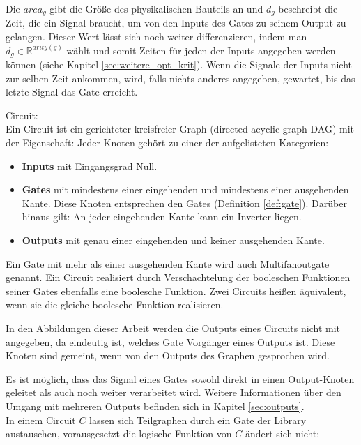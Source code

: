 \documentclass[11pt, a4paper, german]{article}
\begin{document}
Die $area_g$ gibt die Größe des physikalischen Bauteils an und $d_g$ beschreibt die Zeit, die ein Signal braucht, um von den Inputs des Gates zu seinem Output zu gelangen. Dieser Wert lässt sich noch weiter differenzieren, indem man $d_g \in \mathbb{R}^{arity(g)}$ wählt und somit Zeiten für jeden der Inputs angegeben werden können (siehe Kapitel  \ref{sec:weitere_opt_krit}).
Wenn die Signale der Inputs nicht zur selben Zeit ankommen, wird, falls nichts anderes angegeben, gewartet, bis das letzte Signal das Gate erreicht.

\begin{definition}{Circuit:}\\
Ein Circuit ist ein gerichteter kreisfreier Graph (directed acyclic graph DAG) mit der Eigenschaft: Jeder Knoten gehört zu einer der aufgelisteten Kategorien: 
\begin{itemize}
\item {\bf Inputs }mit Eingangsgrad Null.
\item{\bf Gates} mit mindestens einer eingehenden und mindestens einer ausgehenden Kante.
Diese Knoten entsprechen den Gates (Definition \ref{def:gate}). Darüber hinaus gilt: An jeder eingehenden Kante kann ein Inverter liegen.
\item{\bf Outputs} mit genau einer eingehenden und keiner ausgehenden Kante.
\end{itemize}
Ein Gate mit mehr als einer ausgehenden Kante wird auch Multifanoutgate genannt.
Ein Circuit realisiert durch Verschachtelung der booleschen Funktionen seiner Gates ebenfalls eine boolesche Funktion. Zwei Circuits heißen äquivalent, wenn sie die gleiche boolesche Funktion realisieren.
\end{definition}

In den Abbildungen dieser Arbeit werden die Outputs eines Circuits nicht mit angegeben, da eindeutig ist, welches Gate Vorgänger eines Outputs ist. Diese Knoten sind gemeint, wenn von den Outputs des Graphen gesprochen wird. 

Es ist möglich, dass das Signal eines Gates sowohl direkt in einen Output-Knoten geleitet als auch noch weiter verarbeitet wird. Weitere Informationen über den Umgang mit mehreren Outputs befinden sich in Kapitel \ref{sec:outputs}.\\
In einem Circuit $C$ lassen sich Teilgraphen durch ein Gate der Library austauschen, vorausgesetzt die logische Funktion von $C$ ändert sich nicht: 
\end{document}
